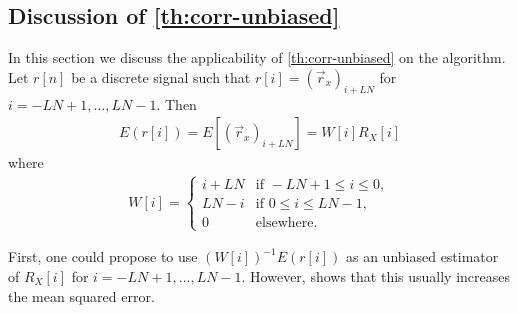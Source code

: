 \documentclass[a4paper, openany, oneside]{memoir}
\begin{document}
\subsection{Discussion of \cref{th:corr-unbiased}}
In this section we discuss the applicability of \cref{th:corr-unbiased} on the algorithm. Let $r[n]$ be a discrete signal such that $r[i] = (\vec{r}_x)_{i+LN}$ for $i = -LN+1,\ldots,LN-1$. Then
\begin{align*}
    E(r[i])=E[(\vec{r}_x)_{i + LN}]=W[i]R_X[i]
\end{align*}
where
\begin{align*}
    W[i] = \begin{cases}
        i+LN  &\text{if } -LN+1 \le i \le 0, \\
        LN-i&\text{if } 0 \le i \le LN-1, \\
        0 & \text{elsewhere.}
    \end{cases}
\end{align*}

First, one could propose to use $(W[i])^{-1}E(r[i])$ as an unbiased estimator of $R_X[i]$ for $i=-LN+1,\ldots,LN-1$. However, \cite{percival1993univariate} shows that this usually increases the mean squared error.
\end{document}
